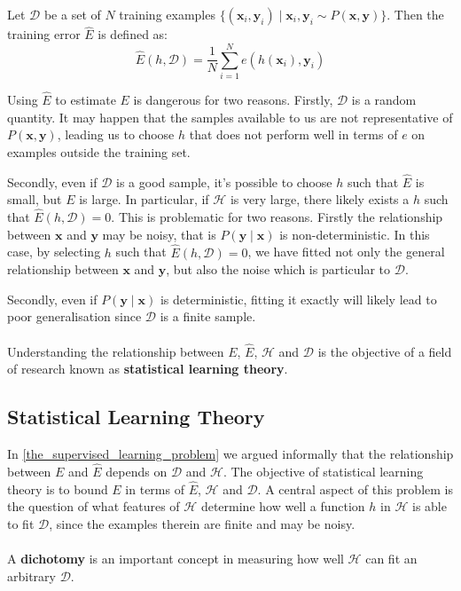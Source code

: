 \begin{definition}
	Let $\mathcal{D}$ be a set of $N$ training examples $\{(\mathbf{x}_i, \mathbf{y}_i) \mid \mathbf{x}_i, \mathbf{y}_i \sim P(\mathbf{x}, \mathbf{y})\}$. Then the training error $\hat{E}$ is defined as:
	$$
		\hat{E}(h, \mathcal{D}) = \frac{1}{N}\sum\limits_{i=1}^N e(h(\mathbf{x}_i), \mathbf{y}_i)
	$$
\end{definition}
Using $\hat{E}$ to estimate $E$ is dangerous for two reasons. Firstly, $\mathcal{D}$ is a random quantity. It may happen that the samples available to us are not representative of $P(\mathbf{x}, \mathbf{y})$, leading us to choose $h$ that does not perform well in terms of $e$ on examples outside the training set.

Secondly, even if $\mathcal{D}$ is a good sample, it's possible to choose $h$ such that $\hat{E}$ is small, but $E$ is large. In particular, if $\mathcal{H}$ is very large, there likely exists a $h$ such that $\hat{E}(h, \mathcal{D}) = 0$. This is problematic for two reasons. Firstly the relationship between $\mathbf{x}$ and $\mathbf{y}$ may be noisy, that is $P(\mathbf{y} \mid \mathbf{x})$ is non-deterministic. In this case, by selecting $h$ such that $\hat{E}(h, \mathcal{D}) = 0$, we have fitted not only the general relationship between $\mathbf{x}$ and $\mathbf{y}$, but also the noise which is particular to $\mathcal{D}$.

Secondly, even if $P(\mathbf{y} \mid \mathbf{x})$ is deterministic, fitting it exactly will likely lead to poor generalisation since $\mathcal{D}$ is a finite sample. 
\\\\
Understanding the relationship between $E$, $\hat{E}$, $\mathcal{H}$ and $\mathcal{D}$ is the objective of a field of research known as \textbf{statistical learning theory}.

\subsection{Statistical Learning Theory}
In \ref{the_supervised_learning_problem} we argued informally that the relationship between $E$ and $\hat{E}$ depends on $\mathcal{D}$ and $\mathcal{H}$. The objective of statistical learning theory is to bound $E$ in terms of $\hat{E}$, $\mathcal{H}$ and $\mathcal{D}$. A central aspect of this problem is the question of what features of $\mathcal{H}$ determine how well a function $h$ in $\mathcal{H}$ is able to fit $\mathcal{D}$, since the examples therein are finite and may be noisy.
\\\\
A \textbf{dichotomy} is an important concept in measuring how well $\mathcal{H}$ can fit an arbitrary $\mathcal{D}$.